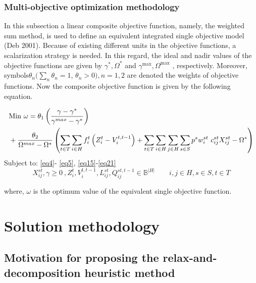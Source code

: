 \documentclass[review]{elsarticle}
\begin{document}
\subsubsection{Multi-objective optimization methodology}
In this subsection a linear composite objective function, namely, the weighted sum method, is used to define an equivalent integrated single objective model (Deb 2001). Because of existing different units in the objective functions, a scalarization strategy is needed. In this regard, the ideal and nadir values of the objective functions are given by ${\gamma }^*, {\Omega }^*$ and $\gamma^{\max}, {\Omega }^{\max}$ , respectively. Moreover, symbols${\theta }_n(\sum_n{{\theta }_n}=1$, ${\theta }_n>0), {n=1, 2}$ are denoted the weights of objective functions. Now the composite objective function is given by the following equation.

\begin{align}\label{eq23}
&{\rm Min}\ \omega ={\theta }_1\left(\frac{\gamma -{\gamma }^*}{{\gamma }^{max}-{\gamma }^*}\right)\nonumber\\
&+\frac{\theta_2 }{{\Omega }^{max}-{\Omega }^*}\left({\sum_{t\in T}{\sum_{i\in H}{f^t_i\left(Z^t_i-V^{t,t-1}_i\right)}}+\sum_{t\in T}{\sum_{i\in H}{\sum_{j\in H}{\sum_{s\in S}{p^sw^{st}_i{\ c}^{st}_{ij}X^{st}_{ij}}}}}-{\Omega }^*}\right)
\end{align}
Subject to: \eqref{eq4}- \eqref{eq5}, \eqref{eq15}-\eqref{eq21}
\[
X^{st}_{ij},\gamma \ge 0\ ,Z^t_i,V^{t,t-1}_i,L^{st}_{ij},Q^{st,t-1}_{ij}\in {\mathbb{ B}}^{\left|H\right|}\qquad
i,j\in H, s\in S, t\in T\]

where, $\omega $ is the optimum value of the equivalent single objective function.

\section{Solution methodology}\label{se4}

\subsection{Motivation for proposing the relax-and-decomposition heuristic method}
\end{document}
